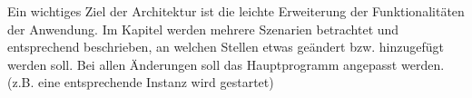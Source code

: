 Ein wichtiges Ziel der Architektur ist die leichte Erweiterung der Funktionalitäten der Anwendung. 
Im Kapitel werden mehrere Szenarien betrachtet und entsprechend beschrieben, an welchen Stellen etwas geändert bzw.
hinzugefügt werden soll. Bei allen Änderungen soll das Hauptprogramm angepasst werden.
(z.B. eine entsprechende Instanz wird gestartet)